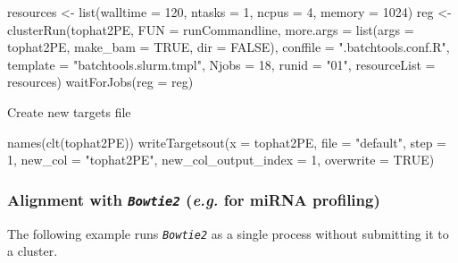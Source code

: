 \documentclass[14pt,]{article}
\newcommand{\hlnum}[1]{\textcolor[rgb]{0.816,0.125,0.439}{#1}}%
\newcommand{\hlstr}[1]{\textcolor[rgb]{0.251,0.627,0.251}{#1}}%
\newcommand{\hlstd}[1]{\textcolor[rgb]{0.251,0.251,0.251}{#1}}%
\newcommand{\hlkwc}[1]{\textcolor[rgb]{0.251,0.251,0.251}{#1}}%
\newcommand{\hlkwd}[1]{\textcolor[rgb]{0.878,0.439,0.125}{#1}}%
\newenvironment{Shaded}{\begin{myshaded}}{\end{myshaded}}
\newcommand{\KeywordTok}[1]{\hlkwd{#1}}
\newcommand{\DataTypeTok}[1]{\hlkwc{#1}}
\newcommand{\DecValTok}[1]{\hlnum{#1}}
\newcommand{\StringTok}[1]{\hlstr{#1}}
\newcommand{\OtherTok}[1]{{#1}}
\newcommand{\NormalTok}[1]{\hlstd{#1}}
\begin{document}
\begin{Shaded}
\begin{Highlighting}[]
\NormalTok{resources <-}\StringTok{ }\KeywordTok{list}\NormalTok{(}\DataTypeTok{walltime =} \DecValTok{120}\NormalTok{, }\DataTypeTok{ntasks =} \DecValTok{1}\NormalTok{, }\DataTypeTok{ncpus =} \DecValTok{4}\NormalTok{, }\DataTypeTok{memory =} \DecValTok{1024}\NormalTok{)}
\NormalTok{reg <-}\StringTok{ }\KeywordTok{clusterRun}\NormalTok{(tophat2PE, }\DataTypeTok{FUN =}\NormalTok{ runCommandline, }\DataTypeTok{more.args =} \KeywordTok{list}\NormalTok{(}\DataTypeTok{args =}\NormalTok{ tophat2PE, }
    \DataTypeTok{make_bam =} \OtherTok{TRUE}\NormalTok{, }\DataTypeTok{dir =} \OtherTok{FALSE}\NormalTok{), }\DataTypeTok{conffile =} \StringTok{".batchtools.conf.R"}\NormalTok{, }\DataTypeTok{template =} \StringTok{"batchtools.slurm.tmpl"}\NormalTok{, }
    \DataTypeTok{Njobs =} \DecValTok{18}\NormalTok{, }\DataTypeTok{runid =} \StringTok{"01"}\NormalTok{, }\DataTypeTok{resourceList =}\NormalTok{ resources)}
\KeywordTok{waitForJobs}\NormalTok{(}\DataTypeTok{reg =}\NormalTok{ reg)}
\end{Highlighting}
\end{Shaded}

Create new targets file

\begin{Shaded}
\begin{Highlighting}[]
\KeywordTok{names}\NormalTok{(}\KeywordTok{clt}\NormalTok{(tophat2PE))}
\KeywordTok{writeTargetsout}\NormalTok{(}\DataTypeTok{x =}\NormalTok{ tophat2PE, }\DataTypeTok{file =} \StringTok{"default"}\NormalTok{, }\DataTypeTok{step =} \DecValTok{1}\NormalTok{, }\DataTypeTok{new_col =} \StringTok{"tophat2PE"}\NormalTok{, }
    \DataTypeTok{new_col_output_index =} \DecValTok{1}\NormalTok{, }\DataTypeTok{overwrite =} \OtherTok{TRUE}\NormalTok{)}
\end{Highlighting}
\end{Shaded}

\hypertarget{alignment-with-bowtie2-e.g.-for-mirna-profiling}{%
\subsubsection{\texorpdfstring{Alignment with \emph{\texttt{Bowtie2}} (\emph{e.g.} for miRNA profiling)}{Alignment with Bowtie2 (e.g. for miRNA profiling)}}\label{alignment-with-bowtie2-e.g.-for-mirna-profiling}}

The following example runs \emph{\texttt{Bowtie2}} as a single process without submitting it to a cluster.
\end{document}
